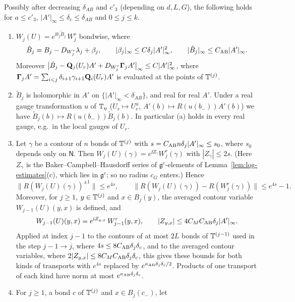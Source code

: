 \begin{lemma}\label{lem:AB-bounds}
Possibly after decreasing $\delta_{AB}$ and $c'_3$ (depending on $d,L,G$), the following holds for $a\le c'_3$, $|A'|_\infty\le\delta_c\le\delta_{AB}$ and $0\le j\le k$.
\begin{enumerate}[label=(\alph*)]
\item $W_j(U)=e^{\ii\delta_j\tilde B_j}\,W^r_j$ bondwise, where
\begin{equation}\label{eq:AB-field}
\tilde B_j=B_j-D_{W^r_j}\lambda_j+\beta_j,\qquad|\beta_j|_\infty\le C\delta_j|A'|^2_\infty,\qquad|\tilde B_j|_\infty\le C_{\rm AB}|A'|_\infty .
\end{equation}
Moreover $\big|\tilde B_j-\mathbf Q_j(U_r)A'+D_{W^r_j}\boldsymbol\Gamma_jA'\big|_\infty\le C|A'|_\infty^2$, where $\boldsymbol\Gamma_jA'=\sum_{i<j}\delta_{i+1}\gamma_{i+1}\mathbf Q_i(U_r)A'$ is evaluated at the points of $\mathbb T^{(j)}$.
\item $\tilde B_j$ is holomorphic in $A'$ on $\{|A'|_\infty<\delta_{AB}\}$, and real for real $A'$. Under a real gauge transformation $u$ of $\mathbb T_\eta$ ($U_r\mapsto U_r^u$, $A'(b)\mapsto R(u(b_-))A'(b)$) we have $\tilde B_j(b)\mapsto R(u(b_-))\tilde B_j(b)$. In particular (a) holds in every real gauge, e.g.\ in the local gauges of $U_r$.
\item Let $\gamma$ be a contour of $n$ bonds of $\mathbb T^{(j)}$ with $s=C_{\rm AB}n\delta_j|A'|_\infty\le s_0$, where $s_0$ depends only on $\mathsf N$. Then $W_j(U)(\gamma)=e^{\ii Z_\gamma}W^r_j(\gamma)$ with $|Z_\gamma|\le2s$. (Here $Z_\gamma$ is the Baker--Campbell--Hausdorff series of $\mathfrak g^c$-elements of Lemma~\ref{lem:log-estimates}(c), which lies in $\mathfrak g^c$; so no radius $c_G$ enters.) Hence
\[
\|R(W_j(U)(\gamma))^{\pm1}\|\le e^{4s},\qquad\|R(W_j(U)(\gamma))-R(W^r_j(\gamma))\|\le e^{4s}-1 .
\]
Moreover, for $j\ge1$, $y\in\mathbb T^{(j)}$ and $x\in B_j(y)$, the averaged contour variable $W_{j-1}(U)(y,x)$ is defined, and
\[
W_{j-1}(U)(y,x)=e^{\mathrm i Z_{y,x}}\,W^r_{j-1}(y,x),\qquad|Z_{y,x}|\le4C_MC_{\rm AB}\delta_j|A'|_\infty .
\]
Applied at index $j-1$ to the contours of at most $2L$ bonds of $\mathbb T^{(j-1)}$ used in the step $j-1\to j$, where $4s\le8C_{\rm AB}\delta_j\delta_c$, and to the averaged contour variables, where $2|Z_{y,x}|\le8C_MC_{\rm AB}\delta_j\delta_c$, this gives these bounds for both kinds of transports with $e^{4s}$ replaced by $e^{\kappa_{\rm AB}\delta_j\delta_c/2}$. Products of one transport of each kind have norm at most $e^{\kappa_{\rm AB}\delta_j\delta_c}$.
\item For $j\ge1$, a bond $c$ of $\mathbb T^{(j)}$ and $x\in B_j(c_-)$, let

\end{enumerate}
\end{lemma}
